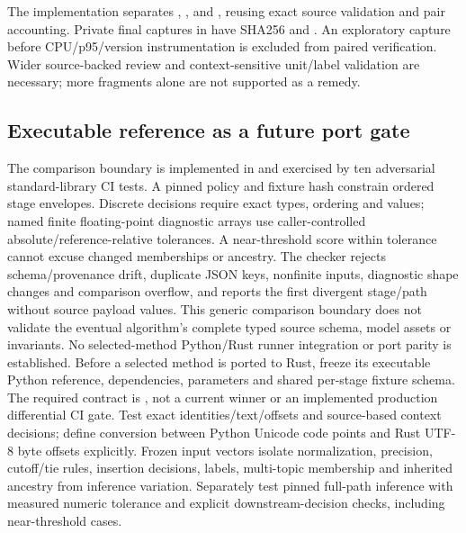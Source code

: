 \documentclass[11pt]{article}
\begin{document}
The implementation separates , ,
 and , reusing exact
source validation and pair accounting. Private final captures in
 have SHA256
and .
An exploratory capture before CPU/p95/version instrumentation is excluded from
paired verification. Wider source-backed review and context-sensitive unit/label
validation are necessary; more fragments alone are not supported as a remedy.

\subsection{Executable reference as a future port gate}
The comparison boundary is implemented in 
and exercised by ten adversarial standard-library CI tests. A pinned policy and
fixture hash constrain ordered stage envelopes. Discrete decisions require exact
types, ordering and values; named finite floating-point diagnostic arrays use
caller-controlled absolute/reference-relative tolerances. A near-threshold score
within tolerance cannot excuse changed memberships or ancestry. The checker
rejects schema/provenance drift, duplicate JSON keys, nonfinite inputs, diagnostic
shape changes and comparison overflow, and reports the first divergent stage/path
without source payload values. This generic comparison boundary does not validate
the eventual algorithm's complete typed source schema, model assets or invariants.
No selected-method Python/Rust runner integration or port parity is established.
Before a selected method is ported to Rust, freeze its executable Python reference,
dependencies, parameters and shared per-stage fixture schema. The required
contract is , not a current winner or an
implemented production differential CI gate. Test exact identities/text/offsets
and source-based context decisions; define conversion between Python Unicode
code points and Rust UTF-8 byte offsets explicitly. Frozen input vectors isolate
normalization, precision, cutoff/tie rules, insertion decisions, labels,
multi-topic membership and inherited ancestry from inference variation.
Separately test pinned full-path inference with measured numeric tolerance and
explicit downstream-decision checks, including near-threshold cases.
\end{document}
